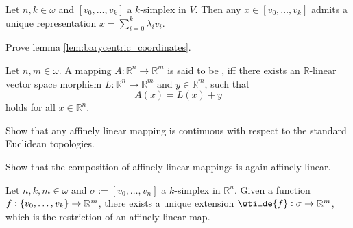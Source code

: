 \begin{lemma}
	\label{lem:barycentric_coordinates}
	Let $n,k \in \omega$ and $[v_0,\dots,v_k]$ a $k$-simplex in $V$. Then any $x \in [v_0,\dots,v_k]$ admits a unique representation $x = \sum_{i = 0}^k \lambda_i v_i$.
\end{lemma}

\begin{exercise}
	Prove lemma \ref{lem:barycentric_coordinates}.
\end{exercise}

\begin{definition}
	Let $n,m \in \omega$. A mapping $A : \mathbb{R}^n \to \mathbb{R}^m$ is said to be , iff there exists an $\mathbb{R}$-linear vector space morphism $L : \mathbb{R}^n \to \mathbb{R}^m$ and $y \in \mathbb{R}^m$, such that 
	\begin{equation*}
		A(x) = L(x) + y
	\end{equation*}
	\noindent holds for all $x \in \mathbb{R}^n$.
\end{definition}

\begin{exercise}
	\label{ex:continuity_affine_map}
	Show that any affinely linear mapping is continuous with respect to the standard Euclidean topologies.
\end{exercise}

\begin{exercise}
	\label{ex:affinely_linear}
	Show that the composition of affinely linear mappings is again affinely linear.
\end{exercise}

\begin{proposition}
	\label{prop:affine_map_induced_by_vertex_map}
	Let $n,k,m \in \omega$ and $\sigma := [v_0,\dots,v_n]$ a $k$-simplex in $\mathbb{R}^n$. Given a function $f : \cbr{v_0,\dots,v_k} \to \mathbb{R}^m$, there exists a unique extension $\wtilde{f} : \sigma \to \mathbb{R}^m$, which is the restriction of an affinely linear map.
\end{proposition}


